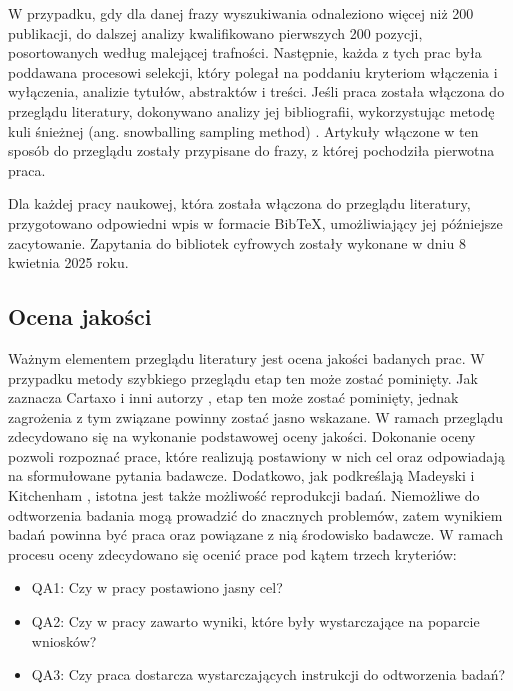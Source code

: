 W przypadku, gdy dla danej frazy wyszukiwania odnaleziono więcej niż 200 publikacji, do dalszej analizy kwalifikowano pierwszych 200 pozycji, posortowanych według malejącej trafności.
Następnie, każda z tych prac była poddawana procesowi selekcji, który polegał na poddaniu kryteriom włączenia i wyłączenia, analizie tytułów, abstraktów i treści.
Jeśli praca została włączona do przeglądu literatury, dokonywano analizy jej bibliografii, wykorzystując metodę kuli śnieżnej (ang. snowballing sampling method) \cite{10.1214/aoms/1177705148}.
Artykuły włączone w ten sposób do przeglądu zostały przypisane do frazy, z której pochodziła pierwotna praca.

Dla każdej pracy naukowej, która została włączona do przeglądu literatury, przygotowano odpowiedni wpis w formacie BibTeX, umożliwiający jej późniejsze zacytowanie. 
Zapytania do bibliotek cyfrowych zostały wykonane w dniu 8 kwietnia 2025 roku. 

\subsection{Ocena jakości}\label{chapter:ocena_jakosci}

Ważnym elementem przeglądu literatury jest ocena jakości badanych prac.
W przypadku metody szybkiego przeglądu etap ten może zostać pominięty.
Jak zaznacza Cartaxo i inni autorzy \cite{cartaxo2020rapidreviewssoftwareengineering}, etap ten może zostać pominięty, jednak zagrożenia z tym związane powinny zostać jasno wskazane.
W ramach przeglądu zdecydowano się na wykonanie podstawowej oceny jakości.
Dokonanie oceny pozwoli rozpoznać prace, które realizują postawiony w nich cel oraz odpowiadają na sformułowane pytania badawcze.
Dodatkowo, jak podkreślają Madeyski i Kitchenham \cite{wouldWiderAdoption}, istotna jest także możliwość reprodukcji badań.
Niemożliwe do odtworzenia badania mogą prowadzić do znacznych problemów, zatem wynikiem badań powinna być praca oraz powiązane z nią środowisko badawcze.
W ramach procesu oceny zdecydowano się ocenić prace pod kątem trzech kryteriów:

\begin{itemize}
    \item QA1: Czy w pracy postawiono jasny cel?
    \item QA2: Czy w pracy zawarto wyniki, które były wystarczające na poparcie wniosków?
    \item QA3: Czy praca dostarcza wystarczających instrukcji do odtworzenia badań?
\end{itemize}

